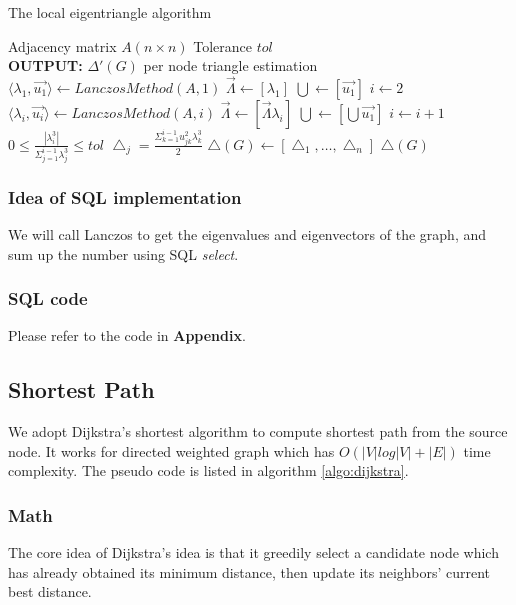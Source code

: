 \begin{algorithm}[!htbf]
\caption{The local eigentriangle algorithm\cite{tsourakakis2008fast}}
\begin{algorithmic}
\REQUIRE Adjacency matrix $A(n \times n)$
\REQUIRE Tolerance $tol$\\
{\bf OUTPUT: } $\Delta'(G)$  per node triangle estimation
\STATE $\langle \lambda_{1},\vec{u_{1}} \rangle \leftarrow LanczosMethod(A,1)$
\STATE $\vec{\Lambda} \leftarrow [\lambda_{1}]$
\STATE $\bigcup \leftarrow [\vec{u_{1}}]$
\STATE $i \leftarrow 2$
\REPEAT
\STATE $\langle \lambda_{i},\vec{u_{i}} \rangle \leftarrow LanczosMethod(A,i)$
\STATE $\vec{\Lambda} \leftarrow [\vec{\Lambda}\lambda_{i}]$
\STATE $\bigcup \leftarrow [\bigcup \vec{u_{1}}]$
\STATE $i \leftarrow i + 1$
\UNTIL $0 \leq \frac{|\lambda_{i}^3|}{\Sigma_{j=1}^{i-1}\lambda_{j}^3} \leq tol$
\STATE $\bigtriangleup_{j} = \frac{\Sigma_{k=1}^{i-1}u_{jk}^2\lambda_{k}^3}{2}$
\ENDFOR
\STATE $\bigtriangleup(G)\leftarrow[\bigtriangleup_{1},\ldots,\bigtriangleup_{n}]$
\RETURN $\bigtriangleup(G)$
\end{algorithmic}
\end{algorithm}




\subsubsection{Idea of SQL implementation}
We will call Lanczos to get the eigenvalues and eigenvectors of the graph, and sum up the number using SQL \emph{select}.

\subsubsection{SQL code}
Please refer to the code in {\bf Appendix}.

\subsection{Shortest Path}
We adopt Dijkstra's shortest algorithm to compute shortest path from the source node. It works for directed weighted
graph which has $O(|V| log |V| + |E|)$ time complexity. The pseudo code is listed in algorithm \ref{algo:dijkstra}.

\subsubsection{Math}
The core idea of Dijkstra's idea is that it greedily select a candidate node which has already obtained its minimum distance, then update its neighbors' current 
best distance. 

